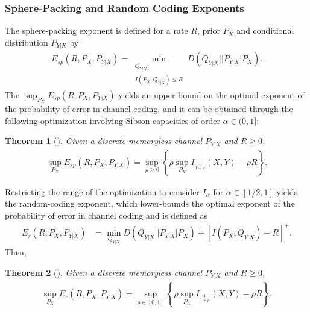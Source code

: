 \documentclass{article}
\newtheorem{theorem}{Theorem}
\numberwithin{theorem}{section}
\numberwithin{example}{section}
\numberwithin{remark}{section}
\numberwithin{definition}{section}
\begin{document}
\subsubsection{Sphere-Packing and Random Coding Exponents}

The sphere-packing exponent is defined for a rate $R$, prior $P_X$ and conditional distribution $P_{Y|X}$ by
\begin{align}
    \label{eq:def-sphere-packing}
    E_{sp} (R,P_X, P_{Y|X}) = \!\!\! \min_{\substack{Q_{Y|X}: \\ I(P_X,Q_{Y|X}) \leq R}} \!\!\!\!\! D(Q_{Y|X} || P_{Y|X} | P_X).
\end{align}
The $\sup_{P_X} E_{sp} (R,P_X,P_{Y|X})$ yields an upper bound on the optimal exponent of the probability of error in channel coding, and it can be obtained through the following optimization involving Sibson capacities of order $\alpha \in (0,1]$:
\begin{theorem}[{\cite[Theorem 8]{verdu:2015}\cite{haroutunian1968estimates}}] Given a discrete memoryless channel $P_{Y|X}$ and $R \geq 0$,
    \label{thm:sphere-packing}
    \begin{align}
        \label{eq:thm-sphere-packing}
        \sup_{P_X} E_{sp} (R,P_X,P_{Y|X}) = \sup_{\rho \geq 0} \left\lbrace \rho \sup_{P_X} I_{\frac{1}{1+\rho}}(X,Y) -\rho R \right\rbrace.
    \end{align}
\end{theorem}
Restricting the range of the optimization to consider $I_\alpha$ for $\alpha \in [1/2,1]$ yields the random-coding exponent, which lower-bounds the optimal exponent of the probability of error in channel coding and is defined as
\begin{align}
    \label{eq:def-random-coding}
    E_{r} (R,P_X,P_{Y|X}) &= \min_{Q_{Y|X}} D(Q_{Y|X} || P_{Y|X} | P_X)+ [I(P_X,Q_{Y|X})-R]^+.
\end{align}
Then,
\begin{theorem}[{\cite[Theorem 8]{verdu:2015}\cite[Corollary 3]{Blahut:74}}] Given a discrete memoryless channel $P_{Y|X}$ and $R \geq 0$,
    \label{thm:random-coding}
    \begin{align}
        \label{eq:thm-random-coding}
        \sup_{P_X} E_{r} (R,P_X,P_{Y|X}) = \sup_{\rho \in [0,1]} \left\lbrace \rho \sup_{P_X} I_{\frac{1}{1+\rho}}(X,Y) -\rho R \right\rbrace.
    \end{align}
\end{theorem}
\end{document}
